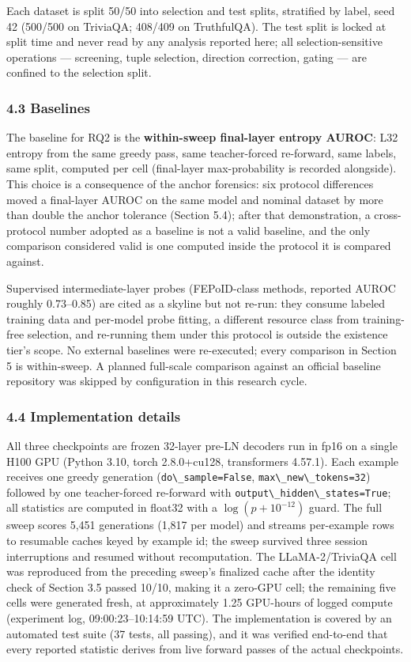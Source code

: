 Each dataset is split 50/50 into selection and test splits, stratified by label, seed 42 (500/500 on TriviaQA; 408/409 on TruthfulQA). The test split is locked at split time and never read by any analysis reported here; all selection-sensitive operations --- screening, tuple selection, direction correction, gating --- are confined to the selection split.

\subsubsection{4.3 Baselines}

The baseline for RQ2 is the \textbf{within-sweep final-layer entropy AUROC}: L32 entropy from the same greedy pass, same teacher-forced re-forward, same labels, same split, computed per cell (final-layer max-probability is recorded alongside). This choice is a consequence of the anchor forensics: six protocol differences moved a final-layer AUROC on the same model and nominal dataset by more than double the anchor tolerance (Section 5.4); after that demonstration, a cross-protocol number adopted as a baseline is not a valid baseline, and the only comparison considered valid is one computed inside the protocol it is compared against.

Supervised intermediate-layer probes (FEPoID-class methods, reported AUROC roughly 0.73--0.85) are cited as a skyline but not re-run: they consume labeled training data and per-model probe fitting, a different resource class from training-free selection, and re-running them under this protocol is outside the existence tier's scope. No external baselines were re-executed; every comparison in Section 5 is within-sweep. A planned full-scale comparison against an official baseline repository was skipped by configuration in this research cycle.

\subsubsection{4.4 Implementation details}

All three checkpoints are frozen 32-layer pre-LN decoders run in fp16 on a single H100 GPU (Python 3.10, torch 2.8.0+cu128, transformers 4.57.1). Each example receives one greedy generation (\texttt{do\textbackslash \_sample=False}, \texttt{max\textbackslash \_new\textbackslash \_tokens=32}) followed by one teacher-forced re-forward with \texttt{output\textbackslash \_hidden\textbackslash \_states=True}; all statistics are computed in float32 with a $\log(p + 10^{-12})$ guard. The full sweep scores 5,451 generations (1,817 per model) and streams per-example rows to resumable caches keyed by example id; the sweep survived three session interruptions and resumed without recomputation. The LLaMA-2/TriviaQA cell was reproduced from the preceding sweep's finalized cache after the identity check of Section 3.5 passed 10/10, making it a zero-GPU cell; the remaining five cells were generated fresh, at approximately 1.25 GPU-hours of logged compute (experiment log, 09:00:23--10:14:59 UTC). The implementation is covered by an automated test suite (37 tests, all passing), and it was verified end-to-end that every reported statistic derives from live forward passes of the actual checkpoints.

